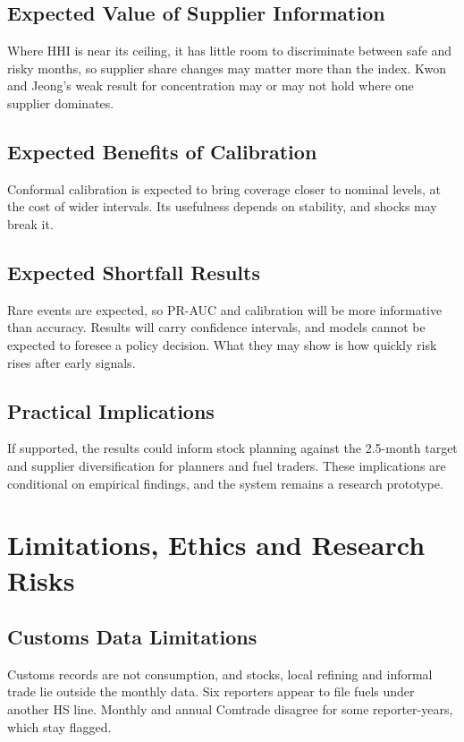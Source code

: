 \documentclass[conference]{IEEEtran}
\begin{document}
\subsection{Expected Value of Supplier Information}
Where HHI is near its ceiling, it has little room to discriminate between safe and risky months, so supplier share changes may matter more than the index. Kwon and Jeong's weak result for concentration \cite{kwon2026} may or may not hold where one supplier dominates.

\subsection{Expected Benefits of Calibration}
Conformal calibration is expected to bring coverage closer to nominal levels, at the cost of wider intervals. Its usefulness depends on stability, and shocks may break it.

\subsection{Expected Shortfall Results}
Rare events are expected, so PR-AUC and calibration will be more informative than accuracy. Results will carry confidence intervals, and models cannot be expected to foresee a policy decision. What they may show is how quickly risk rises after early signals.

\subsection{Practical Implications}
If supported, the results could inform stock planning against the 2.5-month target and supplier diversification for planners and fuel traders. These implications are conditional on empirical findings, and the system remains a research prototype.

\section{Limitations, Ethics and Research Risks}\label{sec:limits}

\subsection{Customs Data Limitations}
Customs records are not consumption, and stocks, local refining and informal trade lie outside the monthly data. Six reporters appear to file fuels under another HS line. Monthly and annual Comtrade disagree for some reporter-years, which stay flagged.
\end{document}
